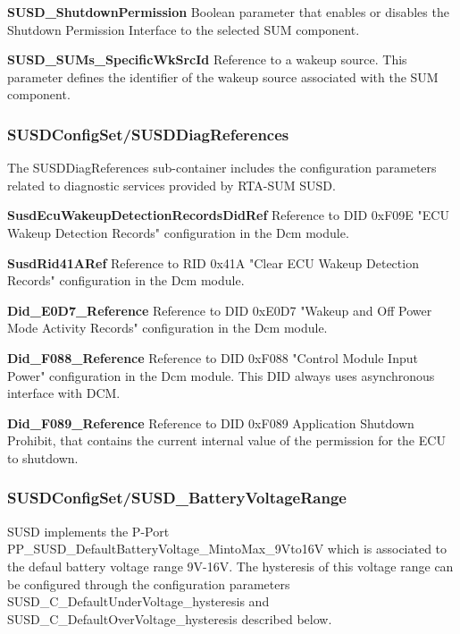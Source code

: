 {\textbf{SUSD\_ShutdownPermission}\newline
Boolean parameter that enables or disables the Shutdown Permission Interface to the selected SUM component.

\textbf{SUSD\_SUMs\_SpecificWkSrcId}\newline
Reference to a wakeup source. This parameter defines the identifier of the wakeup source associated with the SUM component.

\subsubsection{SUSDConfigSet/SUSDDiagReferences}
\label{sec:DcmRef}
The SUSDDiagReferences sub-container includes the configuration parameters related to diagnostic services provided by RTA-SUM SUSD.

\textbf{SusdEcuWakeupDetectionRecordsDidRef}\newline
Reference to DID 0xF09E "ECU Wakeup Detection Records" configuration in the Dcm module.

\textbf{SusdRid41ARef}\newline
Reference to RID 0x41A "Clear ECU Wakeup Detection Records" configuration in the Dcm module.

\textbf{Did\_E0D7\_Reference}\newline
Reference to DID 0xE0D7 "Wakeup and Off Power Mode Activity Records" configuration in the Dcm module.

\textbf{Did\_F088\_Reference}\newline
Reference to DID 0xF088 "Control Module Input Power" configuration in the Dcm module. This DID always uses asynchronous interface with DCM.

\textbf{Did\_F089\_Reference}\newline 
Reference to DID 0xF089 Application Shutdown Prohibit, that contains the current internal value of the permission for the ECU to shutdown.

\subsubsection{SUSDConfigSet/SUSD\_BatteryVoltageRange}
\label{subsection:BatteryVoltageRange}
SUSD implements the P-Port PP\_SUSD\_DefaultBatteryVoltage\_MintoMax\_9Vto16V which is associated to the defaul battery voltage range 9V-16V. The hysteresis of this voltage range can be configured through the configuration parameters SUSD\_C\_DefaultUnderVoltage\_hysteresis and \\ SUSD\_C\_DefaultOverVoltage\_hysteresis described below. \newline

}
